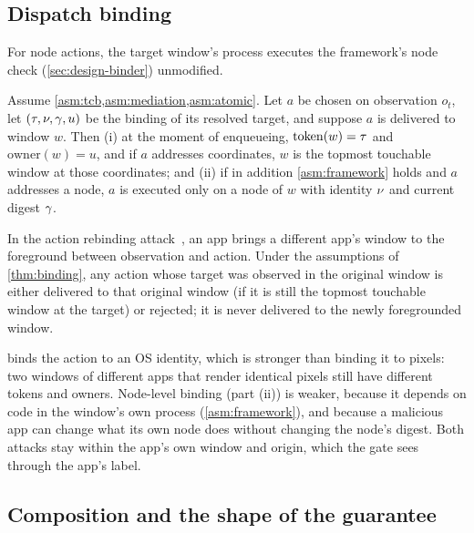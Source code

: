 \subsection{Dispatch binding}

\begin{assumption}\label{asm:framework}
For node actions, the target window's process executes the framework's node check (\cref{sec:design-binder}) unmodified.
\end{assumption}

\begin{theorem}\label{thm:binding}
Assume \cref{asm:tcb,asm:mediation,asm:atomic}. Let $a$ be chosen on observation $o_t$, let $(\tau,\nu,\gamma,u)$ be the binding of its resolved target, and suppose $a$ is delivered to window $w$. Then (i) at the moment of enqueueing, $\mathrm{token}(w)=\tau$ and $\mathrm{owner}(w)=u$, and if $a$ addresses coordinates, $w$ is the topmost touchable window at those coordinates; and (ii) if in addition \cref{asm:framework} holds and $a$ addresses a node, $a$ is executed only on a node of $w$ with identity $\nu$ and current digest $\gamma$.
\end{theorem}

\begin{corollary}\label{cor:rebinding}
In the action rebinding attack~\cite{qian2026zeropermission}, an app brings a different app's window to the foreground between observation and action. Under the assumptions of \cref{thm:binding}, any action whose target was observed in the original window is either delivered to that original window (if it is still the topmost touchable window at the target) or rejected; it is never delivered to the newly foregrounded window.
\end{corollary}

 binds the action to an OS identity, which is stronger than binding it to pixels: two windows of different apps that render identical pixels still have different tokens and owners. Node-level binding (part (ii)) is weaker, because it depends on code in the window's own process (\cref{asm:framework}), and because a malicious app can change what its own node does without changing the node's digest. Both attacks stay within the app's own window and origin, which the gate sees through the app's label.

\subsection{Composition and the shape of the guarantee}

